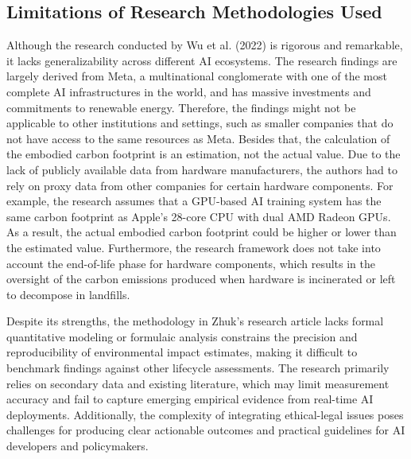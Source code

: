 \documentclass[a4paper, 12pt]{article}
\begin{document}
\subsection{Limitations of Research Methodologies Used}
\hspace{24pt}Although the research conducted by Wu et al. (2022) is rigorous and remarkable, it lacks generalizability across different AI ecosystems. The research findings are largely derived from Meta, a multinational conglomerate with one of the most complete AI infrastructures in the world, and has massive investments and commitments to renewable energy. Therefore, the findings might not be applicable to other institutions and settings, such as smaller companies that do not have access to the same resources as Meta. Besides that, the calculation of the embodied carbon footprint is an estimation, not the actual value. Due to the lack of publicly available data from hardware manufacturers, the authors had to rely on proxy data from other companies for certain hardware components. For example, the research assumes that a GPU-based AI training system has the same carbon footprint as Apple's 28-core CPU with dual AMD Radeon GPUs. As a result, the actual embodied carbon footprint could be higher or lower than the estimated value. Furthermore, the research framework does not take into account the end-of-life phase for hardware components, which results in the oversight of the carbon emissions produced when hardware is incinerated or left to decompose in landfills.

\hspace{24pt} Despite its strengths, the methodology in Zhuk's research article lacks formal quantitative modeling or formulaic analysis constrains the precision and reproducibility of environmental impact estimates, making it difficult to benchmark findings against other lifecycle assessments. The research primarily relies on secondary data and existing literature, which may limit measurement accuracy and fail to capture emerging empirical evidence from real-time AI deployments. Additionally, the complexity of integrating ethical-legal issues poses challenges for producing clear actionable outcomes and practical guidelines for AI developers and policymakers.
\end{document}
